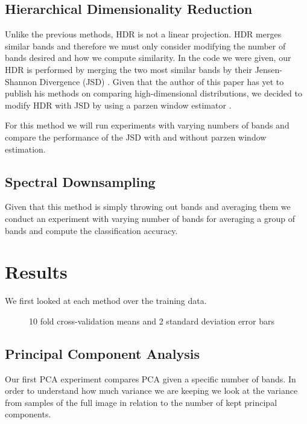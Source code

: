 \documentclass[conference,onecolumn]{IEEEtran}
\begin{document}
\subsection{Hierarchical Dimensionality Reduction}
Unlike the previous methods, HDR is not a linear projection. HDR merges similar bands and therefore we must only consider modifying the number of bands desired and how we compute similarity. In the code we were given, our HDR is performed by merging the two most similar bands by their Jensen-Shannon Divergence (JSD) \cite{JSD}. Given that the author of this paper has yet to publish his methods on comparing high-dimensional distributions, we decided to modify HDR with JSD by using a parzen window estimator \cite{parzen}.

For this method we will run experiments with varying numbers of bands and compare the performance of the JSD with and without parzen window estimation.

\subsection{Spectral Downsampling}
Given that this method is simply throwing out bands and averaging them we conduct an experiment with varying number of bands for averaging a group of bands and compute the classification accuracy.

\section{Results}
We first looked at each method over the training data.

\begin{figure}[H]
	\centering
	\qquad
	\caption{10 fold cross-validation means and 2 standard deviation error bars}
\end{figure}



\subsection{Principal Component Analysis}

Our first PCA experiment compares PCA given a specific number of bands. In order to understand how much variance we are keeping we look at the variance from samples of the full image in relation to the number of kept principal components.
\end{document}
